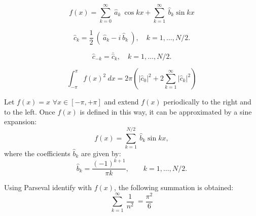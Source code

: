 \begin{equation} 
	f ( x)  =  \sum_{k=0} ^{\infty} \  \hat{a}_k  \ \cos k x + \sum_{k=1} ^{\infty} \  \hat{b}_k  \sin k x
\end{equation} 	

\begin{equation} 
	\hat{c}_k  =  \frac{1}{2} \ ( \ \hat{a}_k  - i \ \hat{b}_k \ ),  \quad k=1, \ldots, N/2. 
\end{equation}	

\begin{equation} 
	\hat{c}_{-k}  =  \overline{ \hat{c}} _{k}  , \quad k=1, \ldots, N/2. 
\end{equation} 	


\begin{equation} 
	\int _{-\pi} ^{\pi} f(x)^2 \ dx = 2 \pi \left(    | \hat{c}_0 |^2 + 2 \sum_{k=1} ^{\infty} |  \hat{c}_k  |^2 \right) 
\end{equation} 

Let $ f(x) = x $ $ \forall x \in [-\pi, +\pi ] $ and extend $ f(x) $  periodically to the right and to the left. Once $ f(x) $ is defined in 
this way, it can be approximated by a sine expansion: 
\begin{equation} 
	f ( x)  =  \sum_{k=1} ^{N/2} \   \hat{b}_k  \sin k x, 
\end{equation} 
where the coefficients $ \hat{b}_k $ are given by:
\begin{equation} 
	\hat{b}_k   = \frac{ (-1)^{k+1} }{ \pi k }, \qquad k=1, \ldots, N/2. 
\end{equation} 

Using Parseval identify with $ f(x)$, the following  summation is obtained: 
\begin{equation} 
	\sum_{k=1} ^{\infty} \  \frac{1}{n^2}  \  = \frac{\pi^2}{6}
\end{equation} 


